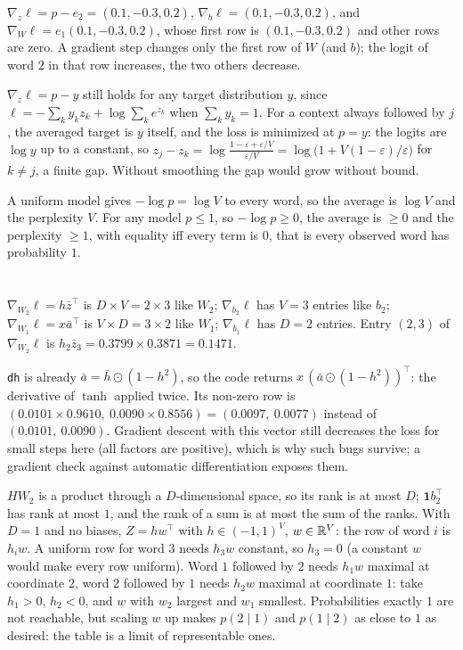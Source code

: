 $\nabla_z\ell = p - e_2 = (0.1, -0.3, 0.2)$, $\nabla_b\ell = (0.1, -0.3, 0.2)$, and $\nabla_W\ell = e_1(0.1, -0.3, 0.2)$, whose first row is $(0.1, -0.3, 0.2)$ and other
rows are zero. A gradient step changes only the first row of $W$ (and $b$); the logit of word $2$ in that row
increases, the two others decrease.

$\nabla_z\ell = p - y$ still holds for any target distribution $y$, since $\ell = -\sum_ky_kz_k + \log\sum_ke^{z_k}$ when $\sum_ky_k = 1$. For a context always
followed by $j$, the averaged target is $y$ itself, and the loss is minimized at $p = y$: the logits are
$\log y$ up to a constant, so $z_j - z_k = \log\frac{1 - \varepsilon + \varepsilon/V}{\varepsilon/V} = \log\bigl(1 + V(1 - \varepsilon)/\varepsilon\bigr)$ for $k\neq j$, a finite gap. Without smoothing the gap
would grow without bound.

A uniform model gives $-\log p = \log V$ to every word, so the average is $\log V$ and the perplexity $V$. For any model
$p\leq1$, so $-\log p\geq0$, the average is $\geq0$ and the perplexity $\geq1$, with equality iff every term is $0$, that is every
observed word has probability $1$.

\section{}

$\nabla_{W_2}\ell = h\bar z^\top$ is $D\times V = 2\times3$ like $W_2$; $\nabla_{b_2}\ell$ has $V = 3$ entries like $b_2$; $\nabla_{W_1}\ell = x\bar a^\top$ is $V\times D = 3\times2$ like $W_1$; $\nabla_{b_1}\ell$
has $D = 2$ entries. Entry $(2, 3)$ of $\nabla_{W_2}\ell$ is $h_2\bar z_3 = 0.3799\times0.3871 = 0.1471$.

\texttt{dh} is already $\bar a = \bar h\odot(1 - h^2)$, so the code returns $x\,(\bar a\odot(1 - h^2))^\top$: the derivative of $\tanh$ applied twice. Its
non-zero row is $(0.0101\times0.9610,\ 0.0090\times0.8556) = (0.0097,\ 0.0077)$ instead of $(0.0101,\ 0.0090)$. Gradient descent with this
vector still decreases the loss for small steps here (all factors are positive), which is why such
bugs survive; a gradient check against automatic differentiation exposes them.

$HW_2$ is a product through a $D$-dimensional space, so its rank is at most $D$; $\mathbf 1b_2^\top$ has rank at most $1$, and the
rank of a sum is at most the sum of the ranks. With $D = 1$ and no biases, $Z = hw^\top$ with $h\in(-1, 1)^V$, $w\in\mathbb{R}^V$: the
row of word $i$ is $h_iw$. A uniform row for word $3$ needs $h_3w$ constant, so $h_3 = 0$ (a constant $w$ would make every row
uniform). Word $1$ followed by $2$ needs $h_1w$ maximal at coordinate $2$, word $2$ followed by $1$ needs $h_2w$ maximal at
coordinate $1$: take $h_1 > 0$, $h_2 < 0$, and $w$ with $w_2$ largest and $w_1$ smallest. Probabilities exactly $1$ are not reachable, but
scaling $w$ up makes $p(2\mid1)$ and $p(1\mid2)$ as close to $1$ as desired: the table is a limit of representable
ones.

